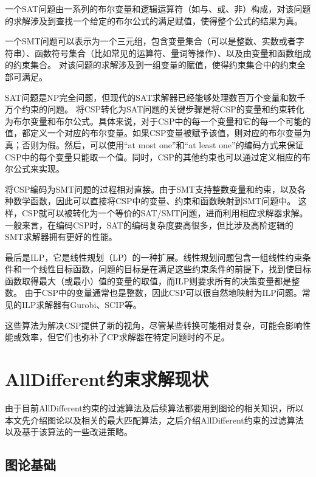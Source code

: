 \begin{definition}
    一个SAT问题由一系列的布尔变量和逻辑运算符（如与、或、非）构成，对该问题的求解涉及到查找一个给定的布尔公式的满足赋值，使得整个公式的结果为真。
\end{definition}

\begin{definition}
    一个SMT问题可以表示为一个三元组，包含变量集合（可以是整数、实数或者字符串）、函数符号集合（比如常见的运算符、量词等操作）、以及由变量和函数组成的约束集合。
    对该问题的求解涉及到一组变量的赋值，使得约束集合中的约束全部可满足。
\end{definition}

SAT问题是NP完全问题，但现代的SAT求解器已经能够处理数百万个变量和数千万个约束的问题。
将CSP转化为SAT问题的关键步骤是将CSP的变量和约束转化为布尔变量和布尔公式。具体来说，对于CSP中的每一个变量和它的每一个可能的值，都定义一个对应的布尔变量。如果CSP变量被赋予该值，则对应的布尔变量为真；否则为假。然后，可以使用“at most one”和“at least one”的编码方式来保证CSP中的每个变量只能取一个值。同时，CSP的其他约束也可以通过定义相应的布尔公式来实现。

将CSP编码为SMT问题的过程相对直接。由于SMT支持整数变量和约束，以及各种数学函数，因此可以直接将CSP中的变量、约束和函数映射到SMT问题中。
这样，CSP就可以被转化为一个等价的SAT/SMT问题，进而利用相应求解器求解。一般来言，在编码CSP时，SAT的编码复杂度要高很多，但比涉及高阶逻辑的SMT求解器拥有更好的性能。

最后是ILP，它是线性规划（LP）的一种扩展。线性规划问题包含一组线性约束条件和一个线性目标函数，问题的目标是在满足这些约束条件的前提下，找到使目标函数取得最大（或最小）值的变量的取值，而ILP则要求所有的决策变量都是整数。
由于CSP中的变量通常也是整数，因此CSP可以很自然地映射为ILP问题。常见的ILP求解器有Gurobi、SCIP等。

这些算法为解决CSP提供了新的视角，尽管某些转换可能相对复杂，可能会影响性能或效率，但它们也弥补了CP求解器在特定问题时的不足。

\section{AllDifferent约束求解现状}

由于目前AllDifferent约束的过滤算法及后续算法都要用到图论的相关知识，所以本文先介绍图论以及相关的最大匹配算法，之后介绍AllDifferent约束的过滤算法以及基于该算法的一些改进策略。

\subsection{图论基础}

